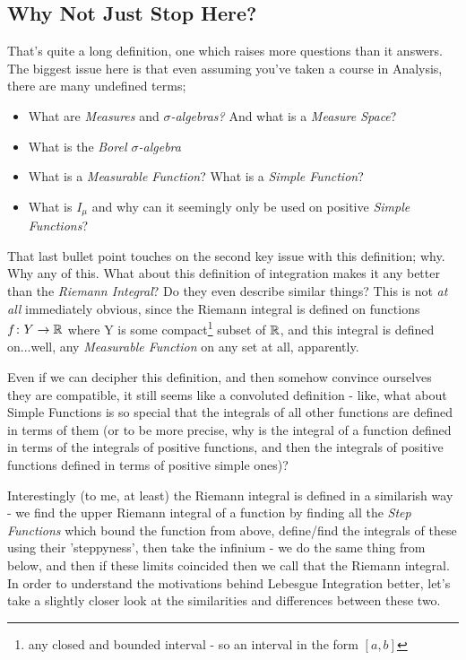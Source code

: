 \subsection{Why Not Just Stop Here?}
That's quite a long definition, one which raises more questions than it answers. The biggest issue here is that even assuming you've taken a course in Analysis, there are many undefined terms;
\begin{itemize}
	\item What are {\em Measures} and {\em $\sigma$-algebras?} And what is a {\em Measure Space}?
	\item What is the {\em Borel $\sigma$-algebra}
	\item What is a {\em Measurable Function\/}? What is a {\em Simple Function}?
	\item What is $I_\mu$ and why can it seemingly only be used on positive {\em Simple Functions}?
\end{itemize}

That last bullet point touches on the second key issue with this definition; why. Why any of this. What about this definition of integration makes it any better than the {\em Riemann Integral}? Do they even describe similar things? This is not {\em at all} immediately obvious, since the Riemann integral is defined on functions $f\colon Y \rightarrow \mathbb{R}$ where Y is some compact\footnote{any closed and bounded interval - so an interval in the form $[a, b]$} subset of $\mathbb{R}$, and this integral is defined on...well, any {\em Measurable Function} on any set at all, apparently.

Even if we can decipher this definition, and then somehow convince ourselves they are compatible, it still seems like a convoluted definition - like, what about Simple Functions is so special that the integrals of all other functions are defined in terms of them (or to be more precise, why is the integral of a function defined in terms of the integrals of positive functions, and then the integrals of positive functions defined in terms of positive simple ones)?

Interestingly (to me, at least) the Riemann integral is defined in a similarish way - we find the upper Riemann integral of a function by finding all the {\em Step Functions} which bound the function from above, define/find the integrals of these using their 'steppyness', then take the infinium - we do the same thing from below, and then if these limits coincided then we call that the Riemann integral. In order to understand the motivations behind Lebesgue Integration better, let's take a slightly closer look at the similarities and differences between these two.
